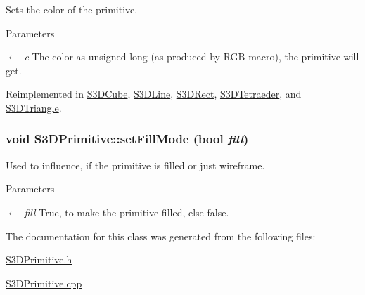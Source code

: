 Sets the color of the primitive. 


\begin{DoxyParams}{Parameters}
\item[\mbox{$\leftarrow$} {\em c}]The color as unsigned long (as produced by RGB-\/macro), the primitive will get. \end{DoxyParams}


Reimplemented in \hyperlink{class_s3_d_cube_a9c48875a16cc0ace3a3092e98663b785}{S3DCube}, \hyperlink{class_s3_d_line_a9feaf056477e858a7b0248a7b5cdd222}{S3DLine}, \hyperlink{class_s3_d_rect_af1a976fbe476e7096b2ceded7ab1659c}{S3DRect}, \hyperlink{class_s3_d_tetraeder_a99856377365e5c26c1f86155909725ed}{S3DTetraeder}, and \hyperlink{class_s3_d_triangle_a2c60503c3bae194ec8247a0e2467c915}{S3DTriangle}.

\hypertarget{class_s3_d_primitive_afd54077b1dbe256b9c6dfe67da7b0a0b}{
\subsubsection[{setFillMode}]{\setlength{\rightskip}{0pt plus 5cm}void S3DPrimitive::setFillMode (bool {\em fill})}}
\label{class_s3_d_primitive_afd54077b1dbe256b9c6dfe67da7b0a0b}


Used to influence, if the primitive is filled or just wireframe. 


\begin{DoxyParams}{Parameters}
\item[\mbox{$\leftarrow$} {\em fill}]True, to make the primitive filled, else false. \end{DoxyParams}


The documentation for this class was generated from the following files:\begin{DoxyCompactItemize}
\item 
\hyperlink{_s3_d_primitive_8h}{S3DPrimitive.h}\item 
\hyperlink{_s3_d_primitive_8cpp}{S3DPrimitive.cpp}\end{DoxyCompactItemize}
